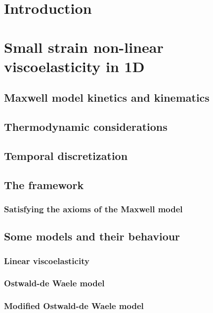 \documentclass[12pt]{article}
\begin{document}
	\printnomenclature

\section{Introduction}	


\section{Small strain non-linear viscoelasticity in 1D}

\subsection{Maxwell model kinetics and kinematics}

\subsection{Thermodynamic considerations}

\subsection{Temporal discretization}

\subsection{The framework}

\subsubsection{Satisfying the axioms of the Maxwell model}

\subsection{Some models and their behaviour}

\subsubsection{Linear viscoelasticity}

\subsubsection{Ostwald-de Waele model}

\subsubsection{Modified Ostwald-de Waele model}
\end{document}
